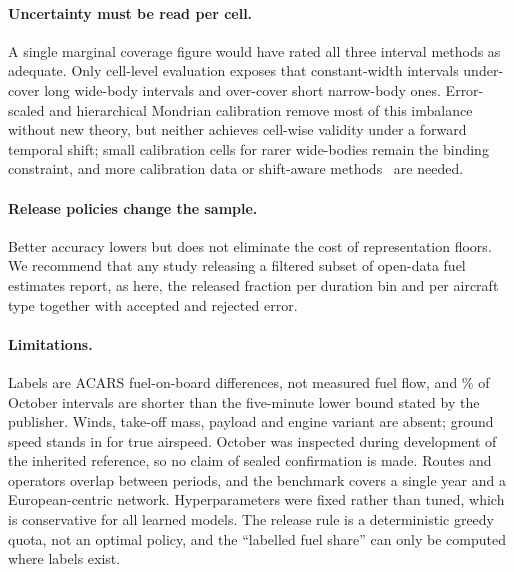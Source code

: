 \documentclass[runningheads]{llncs}
\begin{document}
\paragraph{Uncertainty must be read per cell.}
A single marginal coverage figure would have rated all three interval methods as adequate. Only cell-level evaluation exposes that constant-width intervals under-cover long wide-body intervals and over-cover short narrow-body ones. Error-scaled and hierarchical Mondrian calibration remove most of this imbalance without new theory, but neither achieves cell-wise validity under a forward temporal shift; small calibration cells for rarer wide-bodies remain the binding constraint, and more calibration data or shift-aware methods~\cite{tibshirani2019weighted,gibbs2023conditional} are needed.

\paragraph{Release policies change the sample.}
Better accuracy lowers but does not eliminate the cost of representation floors. We recommend that any study releasing a filtered subset of open-data fuel estimates report, as here, the released fraction per duration bin and per aircraft type together with accepted and rejected error.

\paragraph{Limitations.}
Labels are ACARS fuel-on-board differences, not measured fuel flow, and \shortOct{}\% of October intervals are shorter than the five-minute lower bound stated by the publisher. Winds, take-off mass, payload and engine variant are absent; ground speed stands in for true airspeed. October was inspected during development of the inherited reference, so no claim of sealed confirmation is made. Routes and operators overlap between periods, and the benchmark covers a single year and a European-centric network. Hyperparameters were fixed rather than tuned, which is conservative for all learned models. The release rule is a deterministic greedy quota, not an optimal policy, and the ``labelled fuel share'' can only be computed where labels exist.
\end{document}

